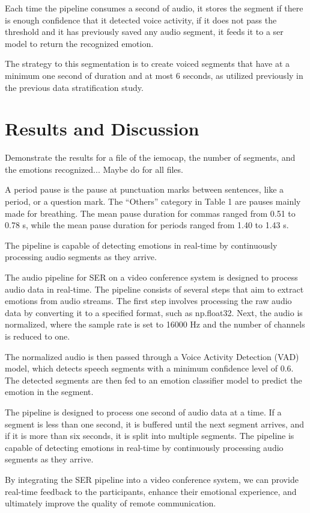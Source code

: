Each time the pipeline consumes a second of audio, it stores the segment if there is enough confidence that it detected voice activity, if it does not pass the threshold and it has previously saved any audio segment, it feeds it to a \ac{ser} model to return the recognized emotion.

The strategy to this segmentation is to create voiced segments that have at a minimum one second of duration and at most 6 seconds, as utilized previously in the previous data stratification study.




\section{Results and Discussion}


Demonstrate the results for a file of the iemocap, the number of segments, and the emotions recognized... Maybe do for all files.


A period pause is the pause at punctuation marks between sentences, like a period, or a question mark. The “Others” category in Table 1 are pauses mainly made for breathing. The mean pause duration for commas ranged from 0.51 to 0.78 s, while the mean pause duration for periods ranged from 1.40 to 1.43 s.


The pipeline is capable of detecting emotions in real-time by continuously processing audio segments as they arrive.


The audio pipeline for SER on a video conference system is designed to process audio data in real-time. The pipeline consists of several steps that aim to extract emotions from audio streams. The first step involves processing the raw audio data by converting it to a specified format, such as np.float32. Next, the audio is normalized, where the sample rate is set to 16000 Hz and the number of channels is reduced to one.

The normalized audio is then passed through a Voice Activity Detection (VAD) model, which detects speech segments with a minimum confidence level of 0.6. The detected segments are then fed to an emotion classifier model to predict the emotion in the segment.

The pipeline is designed to process one second of audio data at a time. If a segment is less than one second, it is buffered until the next segment arrives, and if it is more than six seconds, it is split into multiple segments. The pipeline is capable of detecting emotions in real-time by continuously processing audio segments as they arrive.

By integrating the SER pipeline into a video conference system, we can provide real-time feedback to the participants, enhance their emotional experience, and ultimately improve the quality of remote communication.
